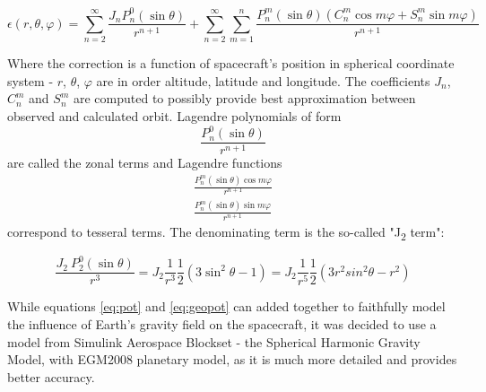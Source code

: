             \begin{equation}
                \epsilon(r, \theta, \varphi) = \sum_{n=2}^{\infty}  \frac{J_n P^0_n(\sin\theta) }{r^{n+1}} + \sum_{n=2}^{\infty} \sum_{m=1}^n \frac{ P^m_n(\sin\theta) (C_n^m \cos m\varphi + S_n^m \sin m\varphi)}{r^{n+1}}\label{eq:geopot}
            \end{equation}

            Where the correction is a function of spacecraft's position in spherical coordinate system - $r$, $\theta$, $\varphi$ are in order altitude, latitude and longitude. The coefficients $J_n$, $C_n^m$ and $S_n^m$ are computed to possibly provide best approximation between observed and calculated orbit. Lagendre polynomials of form 
            \begin{equation}
                \frac{P^0_n(\sin\theta) }{r^{n+1}}    
            \end{equation}
            are called the zonal terms and Lagendre functions 
            \begin{equation}
            \begin{aligned}
                \frac{ P^m_n(\sin\theta) \cos m\varphi}{r^{n+1}}\\
                \frac{ P^m_n(\sin\theta) \sin m\varphi}{r^{n+1}}
            \end{aligned}
            \end{equation}
            correspond to tesseral terms. The denominating term is the so-called "J\textsubscript{2} term":

            \begin{equation}
                \frac{J_2\ P^0_2(\sin\theta)}{r^3} = J_2 \frac{1}{r^3} \frac{1}{2} (3\sin^2\theta -1) = J_2 \frac{1}{r^5} \frac{1}{2} (3 r^2sin^2\theta -r^2)
            \end{equation}

            While equations \eqref{eq:pot} and \eqref{eq:geopot} can added together to faithfully model the influence of Earth's gravity field on the spacecraft, it was decided to use a model from Simulink Aerospace Blockset - the Spherical Harmonic Gravity Model, with EGM2008 planetary model, as it is much more detailed and provides better accuracy.



